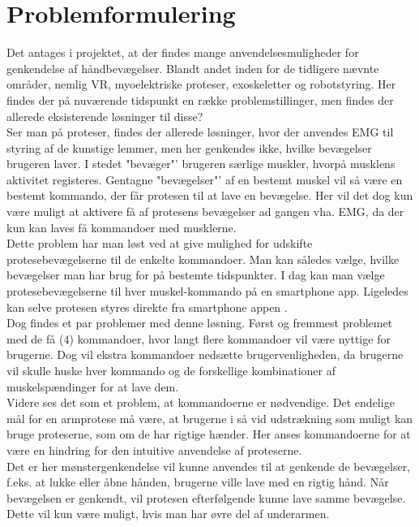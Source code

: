 \thispagestyle{fancy}
\chapter{Problemformulering}
\label{chp:problemformulering}

Det antages i projektet, at der findes mange anvendelsesmuligheder for genkendelse af håndbevægelser. Blandt andet inden for de tidligere nævnte områder, nemlig VR, myoelektriske proteser, exoskeletter og robotstyring. Her findes der på nuværende tidspunkt en række problemstillinger, men findes der allerede eksisterende løsninger til disse?\\

Ser man på proteser, findes der allerede løsninger, hvor der anvendes EMG til styring af de kunstige lemmer, men her genkendes ikke, hvilke bevægelser brugeren laver. I stedet "bevæger"' brugeren særlige muskler, hvorpå musklens aktivitet registeres. Gentagne "bevægelser"' af en bestemt muskel vil så være en bestemt kommando, der får protesen til at lave en bevægelse. Her vil det dog kun være muligt at aktivere få af protesens bevægelser ad gangen vha. EMG, da der kun kan laves få kommandoer med musklerne. \\

Dette problem har man løst ved at give mulighed for udskifte protesebevægelserne til de enkelte kommandoer. Man kan således vælge, hvilke bevægelser man har brug for på bestemte tidspunkter. I dag kan man vælge protesebevægelserne til hver muskel-kommando på en smartphone app. Ligeledes kan selve protesen styres direkte fra smartphone appen \citep{RefWorks:12}.\\
Dog findes et par problemer med denne løsning. Først og fremmest problemet med de få (4) kommandoer, hvor langt flere kommandoer vil være nyttige for brugerne. Dog vil ekstra kommandoer nedsætte brugervenligheden, da brugerne vil skulle huske hver kommando og de forskellige kombinationer af muskelspændinger for at lave dem.\\

Videre ses det som et problem, at kommandoerne er nødvendige. Det endelige mål for en armprotese må være, at brugerne i så vid udstrækning som muligt kan bruge proteserne, som om de har rigtige hænder. Her anses kommandoerne for at være en hindring for den intuitive anvendelse af proteserne.\\

Det er her mønstergenkendelse vil kunne anvendes til at genkende de bevægelser, f.eks. at lukke eller åbne hånden, brugerne ville lave med en rigtig hånd. Når bevægelsen er genkendt, vil protesen efterfølgende kunne lave samme bevægelse. Dette vil kun være muligt, hvis man har øvre del af underarmen. \\


